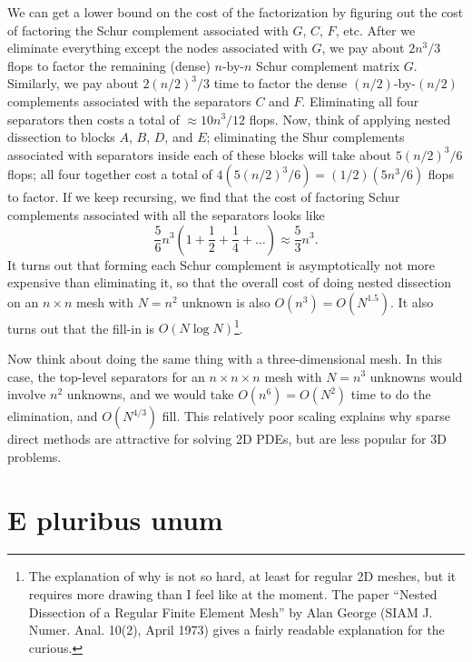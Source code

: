 \documentclass[12pt, leqno]{article}
\begin{document}
We can get a lower bound on the cost of the factorization by figuring
out the cost of factoring the Schur complement associated with $G$,
$C$, $F$, etc.  After we eliminate everything except the nodes
associated with $G$, we pay about $2n^3/3$ flops to factor the
remaining (dense) $n$-by-$n$ Schur complement matrix $G$.  Similarly,
we pay about $2(n/2)^3/3$ time to factor the dense $(n/2)$-by-$(n/2)$
complements associated with the separators $C$ and $F$.  Eliminating
all four separators then costs a total of $\approx 10n^3/12$ flops.
Now, think of applying nested dissection to blocks $A$, $B$, $D$, and
$E$; eliminating the Shur complements associated with separators
inside each of these blocks will take about $5(n/2)^3/6$ flops; all
four together cost a total of $4 ( 5(n/2)^3/6 )= (1/2)
(5n^3/6)$ flops to factor.  If we keep recursing, we find that the
cost of factoring Schur complements associated with all the separators
looks like
\[
  \frac{5}{6} n^3 \left( 1 + \frac{1}{2} + \frac{1}{4} + \ldots \right)
  \approx \frac{5}{3}n^3.
\]
It turns out that forming each Schur complement is asymptotically not
more expensive than eliminating it, so that the overall cost of doing
nested dissection on an $n \times n$ mesh with $N = n^2$ unknown is also
$O(n^3) = O(N^{1.5})$.  It also turns out that the fill-in is
$O(N \log N)$\footnote{
  The explanation of why is not so hard, at least for regular 2D meshes,
  but it requires more drawing than I feel like at the moment.  The paper
  ``Nested Dissection of a Regular Finite Element Mesh'' by Alan George
  (SIAM J. Numer. Anal. 10(2), April 1973) gives a fairly readable explanation
  for the curious.
}.

Now think about doing the same thing with a three-dimensional mesh.
In this case, the top-level separators for an $n \times n \times n$ mesh
with $N = n^3$ unknowns would involve $n^2$ unknowns, and we would take
$O(n^6) = O(N^2)$ time to do the elimination, and $O(N^{4/3})$ fill.
This relatively poor scaling explains why sparse direct methods are attractive
for solving 2D PDEs, but are less popular for 3D problems.

\section{E pluribus unum}

\end{document}
